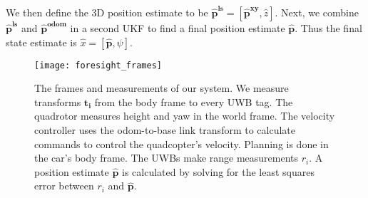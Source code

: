 %

We then define the 3D position estimate to be $\bm{\hat{p}^{ls}} = [\bm{\hat{p}^{xy}}, \hat{z}]$. Next, we combine $\bm{\hat{p}^{ls}}$ and $\bm{\hat{p}^{\text{odom}}}$ in a second UKF to find a final position estimate $\bm{\hat{p}}$. Thus the final state estimate is $\hat{x} = [\bm{\hat{p}}, \psi]$.


\begin{figure}[tb!]
  \centering
    \texttt{[image: foresight\_frames]}
  \caption{The frames and measurements of our system. We measure transforms 
   $\bm{t_{i}}$ from the body frame to every UWB tag. 
   The quadrotor measures height and yaw in the world
   frame. The velocity controller uses the odom-to-base\textunderscore 
   link transform to calculate commands to control the quadcopter's velocity.
   Planning is done in the car's body frame.
   The UWBs make range measurements $r_{i}$. A position estimate $\bm{\hat{p}}$
   is calculated by solving for the least squares error between $r_{i}$ and $\bm{\hat{p}}$.}
  \label{fig:frames}
\end{figure}







